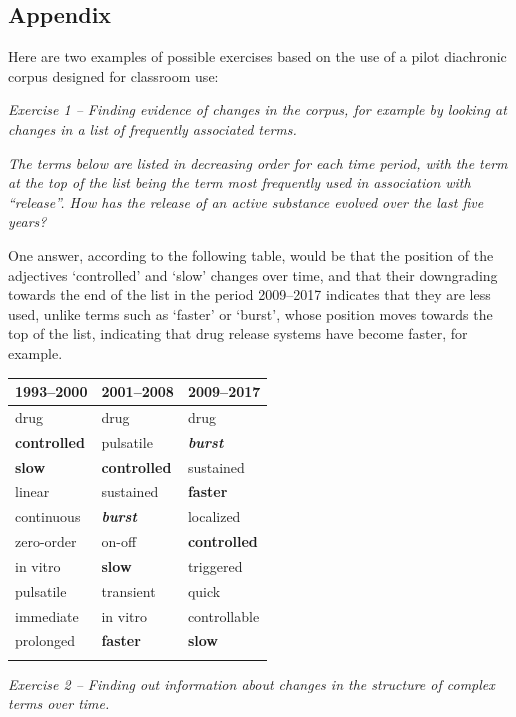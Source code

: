 \documentclass[output=paper]{langscibook}
\begin{document}
\begin{paperappendix}
\section{Appendix}

Here are two examples of possible exercises based on the use of a pilot diachronic corpus designed for classroom use:

\textit{Exercise 1 – Finding evidence of changes in the corpus, for example by looking at changes in a list of frequently associated terms.}

\textit{The terms below are listed in decreasing order for each time period, with the term at the top of the list being the term most frequently used in association with “release”. How has the release of an active substance evolved over the last five years?}

One answer, according to the following table, would be that the position of the adjectives ‘controlled’ and ‘slow’ changes over time, and that their downgrading towards the end of the list in the period 2009–2017 indicates that they are less used, unlike terms such as ‘faster’ or ‘burst’, whose position moves towards the top of the list, indicating that drug release systems have become faster, for example.

\noindent
\begin{tabularx}{\textwidth}{QQl}
\lsptoprule
{{{1993–2000}}} & {{{2001–2008}}} & {{{2009–2017}}}\\
\midrule
drug & drug & drug \\
\textbf{controlled} & pulsatile & \textbf{\textit{burst}} \\
\textbf{slow} & \textbf{controlled}  & sustained \\
linear & sustained & \textbf{faster} \\
continuous & \textbf{\textit{burst}}  & localized \\
zero-order & on-off & \textbf{controlled} \\
in vitro & \textbf{slow}  & triggered \\
pulsatile & transient & quick \\
immediate & in vitro & controllable \\
prolonged & \textbf{faster} & \textbf{slow} \\
\lspbottomrule
\end{tabularx}

\textit{Exercise 2 – Finding out information about changes in the structure of complex terms over time.}


\end{paperappendix}
\end{document}
